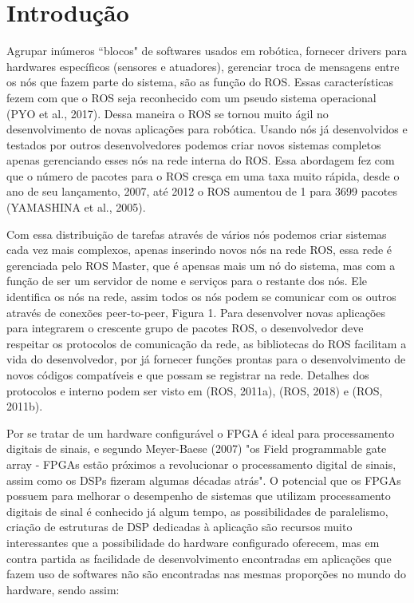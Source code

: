 \chapter{Introdução}



Agrupar inúmeros “blocos" de softwares usados em robótica, fornecer drivers para hardwares
específicos (sensores e atuadores), gerenciar troca de mensagens entre os nós que fazem 
parte do sistema, são as função do ROS. Essas características fezem com que o ROS seja 
reconhecido com um pseudo sistema operacional (PYO et al., 2017). Dessa maneira o ROS se 
tornou muito ágil no desenvolvimento de novas aplicações para robótica. Usando nós já 
desenvolvidos e testados por outros desenvolvedores podemos criar novos sistemas 
completos apenas gerenciando esses nós na rede interna do ROS. Essa abordagem fez com 
que o número de pacotes para o ROS cresça em uma taxa muito rápida, desde o ano de seu 
lançamento, 2007, até 2012 o ROS aumentou de 1 para 3699 pacotes (YAMASHINA et al., 2005).

Com essa distribuição de tarefas através de vários nós podemos criar sistemas cada
vez mais complexos, apenas inserindo novos nós na rede ROS, essa rede é gerenciada
pelo ROS Master, que é apensas mais um nó do sistema, mas com a função de ser um
servidor de nome e serviços para o restante dos nós. Ele identifica os nós na rede, assim
todos os nós podem se comunicar com os outros através de conexões peer-to-peer, Figura
1. Para desenvolver novas aplicações para integrarem o crescente grupo de pacotes ROS, o
desenvolvedor deve respeitar os protocolos de comunicação da rede, as bibliotecas do ROS
facilitam a vida do desenvolvedor, por já fornecer funções prontas para o desenvolvimento
de novos códigos compatíveis e que possam se registrar na rede. Detalhes dos protocolos e
interno podem ser visto em (ROS, 2011a), (ROS, 2018) e (ROS, 2011b).

Por se tratar de um hardware configurável o FPGA é ideal para processamento
digitais de sinais, e segundo Meyer-Baese (2007) "os Field programmable gate array -
FPGAs estão próximos a revolucionar o processamento digital de sinais, assim como os
DSPs fizeram algumas décadas atrás". O potencial que os FPGAs possuem para melhorar o 
desempenho de sistemas que utilizam processamento digitais de sinal é conhecido já algum
tempo, as possibilidades de paralelismo, criação de estruturas de DSP dedicadas à aplicação
são recursos muito interessantes que a possibilidade do hardware configurado oferecem,
mas em contra partida as facilidade de desenvolvimento encontradas em aplicações que
fazem uso de softwares não são encontradas nas mesmas proporções no mundo do hardware,
sendo assim:


